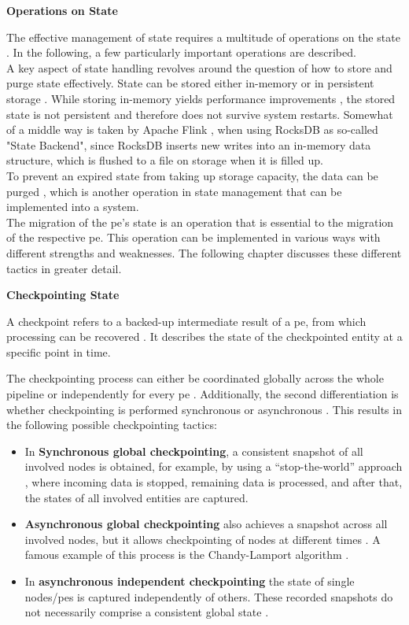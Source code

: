 \textbf{Operations on State}\par
The effective management of state requires a multitude of operations on the state \cite{To.2017}. In the following, a few particularly important operations are described.\\
A key aspect of state handling revolves around the question of how to store and purge state effectively. State can be stored either in-memory or in persistent storage \cite{To.2017}. While storing in-memory yields performance improvements \cite{Venkatesh.2019}, the stored state is not persistent and therefore does not survive system restarts. Somewhat of a middle way is taken by Apache Flink \cite{.06082020}, when using RocksDB as so-called "State Backend", since RocksDB \cite{GitHub.06082020} inserts new writes into an in-memory data structure, which is flushed to a file on storage when it is filled up.\\
To prevent an expired state from taking up storage capacity, the data can be purged \cite{To.2017}, which is another operation in state management that can be implemented into a system.\\
The migration of the \gls{pe}'s state is an operation that is essential to the migration of the respective \gls{pe}. This operation can be implemented in various ways with different strengths and weaknesses. The following chapter discusses these different tactics in greater detail.\par

\textbf{Checkpointing State}\par
A checkpoint refers to a backed-up intermediate result of a \gls{pe}, from which processing can be recovered \cite{Zheng.20}. It describes the state of the checkpointed entity at a specific point in time.\par
The checkpointing process can either be coordinated globally across the whole pipeline or independently for every \gls{pe} \cite{Gibson.2014}. Additionally, the second differentiation is whether checkpointing is performed synchronous or asynchronous \cite{Gibson.2014}. This results in the following possible checkpointing tactics:

\begin{itemize}
    \item In \textbf{Synchronous global checkpointing}, a consistent snapshot of all involved nodes is obtained, for example, by using a “stop-the-world” approach \cite{Murray.2013, Gibson.2014}, where incoming data is stopped, remaining data is processed, and after that, the states of all involved entities are captured.
    \item \textbf{Asynchronous global checkpointing} also achieves a snapshot across all involved nodes, but it allows checkpointing of nodes at different times \cite{Gibson.2014}. A famous example of this process is the Chandy-Lamport algorithm \cite{Chandy.1985}.
    \item In \textbf{asynchronous independent checkpointing} the state of single nodes/\gls{pe}s is captured independently of others. These recorded snapshots do not necessarily comprise a consistent global state \cite{Gibson.2014}.
\end{itemize}


